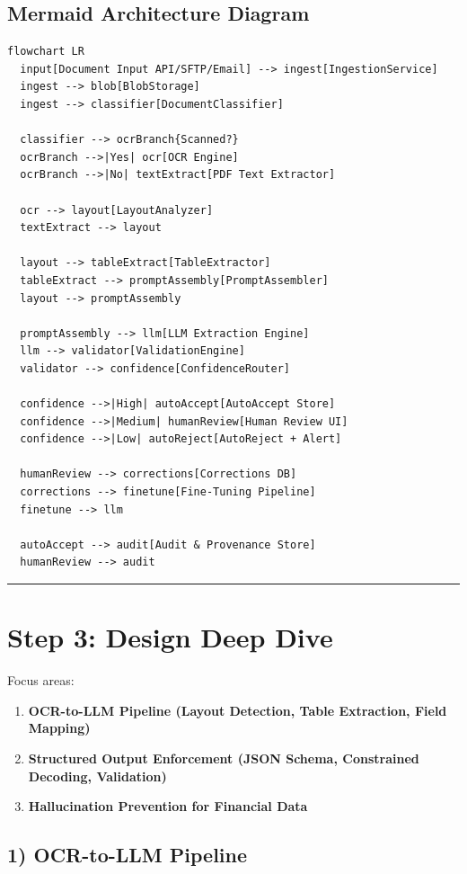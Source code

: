 \subsection*{Mermaid Architecture Diagram}

\begin{verbatim}
flowchart LR
  input[Document Input API/SFTP/Email] --> ingest[IngestionService]
  ingest --> blob[BlobStorage]
  ingest --> classifier[DocumentClassifier]

  classifier --> ocrBranch{Scanned?}
  ocrBranch -->|Yes| ocr[OCR Engine]
  ocrBranch -->|No| textExtract[PDF Text Extractor]

  ocr --> layout[LayoutAnalyzer]
  textExtract --> layout

  layout --> tableExtract[TableExtractor]
  tableExtract --> promptAssembly[PromptAssembler]
  layout --> promptAssembly

  promptAssembly --> llm[LLM Extraction Engine]
  llm --> validator[ValidationEngine]
  validator --> confidence[ConfidenceRouter]

  confidence -->|High| autoAccept[AutoAccept Store]
  confidence -->|Medium| humanReview[Human Review UI]
  confidence -->|Low| autoReject[AutoReject + Alert]

  humanReview --> corrections[Corrections DB]
  corrections --> finetune[Fine-Tuning Pipeline]
  finetune --> llm

  autoAccept --> audit[Audit & Provenance Store]
  humanReview --> audit
\end{verbatim}

\bigskip\hrule\bigskip

\section*{Step 3: Design Deep Dive}

Focus areas:

\begin{enumerate}
  \item \textbf{OCR-to-LLM Pipeline (Layout Detection, Table Extraction, Field Mapping)}
  \item \textbf{Structured Output Enforcement (JSON Schema, Constrained Decoding, Validation)}
  \item \textbf{Hallucination Prevention for Financial Data}
\end{enumerate}

\subsection*{1) OCR-to-LLM Pipeline}

